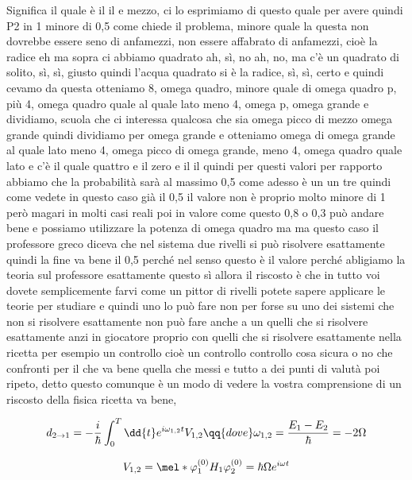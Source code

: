 \begin{soluzione}
{   Significa il quale è il il e mezzo, ci lo esprimiamo di questo quale per avere quindi P2 in 1 minore di 0,5 come chiede il problema, minore quale la questa non dovrebbe essere seno di anfamezzi, non essere affabrato di anfamezzi, cioè la radice eh ma sopra ci abbiamo quadrato ah, sì, no ah, no, ma c'è un quadrato di solito, sì, sì, giusto quindi l'acqua quadrato si è la radice, sì, sì, certo e quindi cevamo da questa otteniamo 8, omega quadro, minore quale di omega quadro p, più 4, omega quadro quale al quale lato meno 4, omega p, omega grande e dividiamo, scuola che ci interessa qualcosa che sia omega picco di mezzo omega grande quindi dividiamo per omega grande e otteniamo omega di omega grande al quale lato meno 4, omega picco di omega grande, meno 4, omega quadro quale lato e c'è il quale quattro e il zero e il il quindi per questi valori per rapporto abbiamo che la probabilità sarà al massimo 0,5 come adesso è un un tre quindi come vedete in questo caso già il 0,5 il valore non è proprio molto minore di 1 però magari in molti casi reali poi in valore come questo 0,8 o 0,3 può andare bene e possiamo utilizzare la potenza di omega quadro ma ma questo caso il professore greco diceva che nel sistema due rivelli si può risolvere esattamente quindi la fine va bene il 0,5 perché nel senso questo è il valore perché abligiamo la teoria sul professore esattamente questo sì allora il riscosto è che in tutto voi dovete semplicemente farvi come un pittor di rivelli potete sapere applicare le teorie per studiare e quindi uno lo può fare non per forse su uno dei sistemi che non si risolvere esattamente non può fare anche a un quelli che si risolvere esattamente anzi in giocatore proprio con quelli che si risolvere esattamente nella ricetta per esempio un controllo cioè un controllo controllo cosa sicura o no che confronti per il che va bene quella che messi e tutto a dei punti di valutà poi ripeto, detto questo comunque è un modo di vedere la vostra comprensione di un riscosto della fisica ricetta va bene,

   
   
   
   \begin{equation*}
      d_{2 \to 1}
      =-\frac{i}{\hbar} \int_{0}^{T} \dd{t} e^{i\omega_{1,2} t} V_{1,2}
      \qq{dove}
      \omega_{1,2}
      =\frac{E_1 - E_2}{\hbar}
      =-2\Omega
   \end{equation*}

   \begin{equation*}
      V_{1,2}
      =\mel*{\varphi_1^{(0)}}{H_1}{\varphi_2^{(0)}}
      =\hbar \Omega e^{i \omega t}
   \end{equation*}

}
\end{soluzione}
